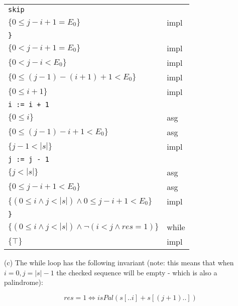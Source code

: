 \documentclass[12pt]{article}
\begin{document}
\begin{center}
\begin{tabular}{ll}
        {\color{gray} \qquad \qquad \texttt{skip}} & \\
        \qquad \qquad $\{ 0 \le j - i + 1 = E_0 \}$ & impl \\
        {\color{gray} \qquad \texttt{\}}} & \\
        \qquad $\{ 0 < j - i + 1 = E_0 \}$ & impl \\
        \qquad $\{ 0 < j - i < E_0 \}$ & impl \\
        \qquad $\{ 0 \le (j - 1) - (i + 1) + 1 < E_0 \}$ & impl \\
        \qquad $\{ 0 \le i + 1 \}$ & impl \\
        {\color{gray} \qquad \texttt{i := i + 1}} & \\
        \qquad $\{ 0 \le i \}$ & asg \\
        \qquad $\{ 0 \le (j - 1) - i + 1 < E_0 \}$ & asg \\
        \qquad $\{ j - 1 < |s| \}$ & impl \\
        {\color{gray} \qquad \texttt{j := j - 1}} & \\
        \qquad $\{ j < |s| \}$ & asg \\
        \qquad $\{ 0 \le j - i + 1 < E_0 \}$ & asg \\
        \qquad $\{ (0 \le i \wedge j < |s|) \wedge 0 \le j - i + 1 < E_0 \}$ & impl \\
        {\color{gray} \texttt{\}}} & \\
        $\{ (0 \le i \wedge j < |s|) \wedge \neg (i < j \wedge res = 1) \}$ & while \\
        $\{ \top \}$ & impl
    \end{tabular}
\end{center}

\noindent (c) The while loop has the following invariant (note: this means that when $i = 0, j = |s| - 1$ the checked sequence will be empty - which is also a palindrome):

$$res = 1 \Leftrightarrow isPal(s[..i] + s[(j + 1)..])$$
\end{document}
